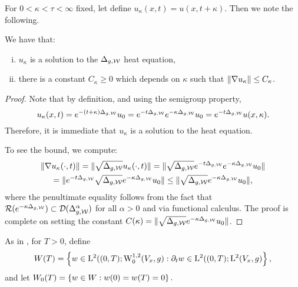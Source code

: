 \documentclass[a4paper, 12pt]{amsart}
\begin{document}
For $0 < \kappa < \tau < \infty$ fixed, let
define $u_\kappa(x,t) = u(x,t+\kappa)$. Then we note the following. 
\begin{lemma}
\label{lem:shiftsol}
We have that: 
\begin{enumerate}[(i)] 
\item $u_\kappa$ is a solution to the $\Delta_{g,\cW}$ heat equation, 
\item there is a constant $C_\kappa \geq 0$
	which depends on $\kappa$ 
	such that $\norm{\nabla u_\kappa} \leq C_\kappa$.
\end{enumerate} 
\end{lemma}
\begin{proof}
Note that by definition, and using the semigroup property, 
$$u_\kappa(x,t) = e^{-(t + \kappa)\Delta_{g,\cW}} u_0 
	=e^{-t \Delta_{g,\cW}}e^{-\kappa\Delta_{g,\cW}}u_0
	=e^{-t \Delta_{g,\cW}}u(x,\kappa).$$ 
Therefore, it is immediate that $u_\kappa$ is a solution
to the heat equation. 

To see the bound, we compute: 
\begin{multline*} 
\norm{ \nabla u_\kappa(\cdot, t)} 
	= \norm{ \sqrt{\Delta_{g,\cW}} u_\kappa(\cdot, t)} 
	= \norm{ \sqrt{\Delta_{g,\cW}} e^{-t\Delta_{g,\cW}} e^{-\kappa \Delta_{g,\cW}}u_0} \\
	= \norm{ e^{-t \Delta_{g,\cW}} \sqrt{ \Delta_{g,\cW}} e^{-\kappa \Delta_{g,\cW}}u_0}
	\leq \norm{\sqrt{ \Delta_{g,\cW}} e^{-\kappa \Delta_{g,\cW}}u_0},
\end{multline*}
where the penultimate equality follows from the fact that
$\ran(e^{-\kappa \Delta_{g,\cW}}) \subset \dom(\Delta_{g,\cW}^\alpha)$
for all $\alpha > 0$ and via functional calculus.
The proof is complete on setting the constant 
$C(\kappa) = \norm{\sqrt{ \Delta_{g,\cW}} e^{-\kappa \Delta_{g,\cW}}u_0}$.
\end{proof}


As in \cite{CS}, for $T > 0$, define 
$$ W(T) = \set{ w \in \Lp{2}( (0,T); \SobH[0]{1}(V_x,g): \partial_t w \in \Lp{2}((0,T); \Lp{2}(V_x, g)},$$
and let $W_0(T) = \set{ w \in W: w(0) = w(T) = 0}.$
\end{document}
